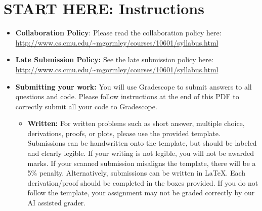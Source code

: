 \documentclass[11pt,addpoints,answers]{exam}
\begin{document}
\section*{START HERE: Instructions}
\begin{itemize}

\item \textbf{Collaboration Policy}: Please read the collaboration policy here: \url{http://www.cs.cmu.edu/~mgormley/courses/10601/syllabus.html}

\item\textbf{Late Submission Policy:} See the late submission policy here: \url{http://www.cs.cmu.edu/~mgormley/courses/10601/syllabus.html}

\item\textbf{Submitting your work:} You will use Gradescope to submit
  answers to all questions and code. Please
  follow instructions at the end of this PDF to correctly submit all your code to Gradescope.

  \begin{itemize}
    

    
   \item \textbf{Written:} For written problems such as short answer, multiple choice, derivations, proofs, or plots, please use the provided template. Submissions can be handwritten onto the template, but should be labeled and clearly legible. If your writing is not legible, you will not be awarded marks. If your scanned submission misaligns the template, there will be a 5\% penalty. Alternatively, submissions can be written in LaTeX. 
   Each derivation/proof should be completed in the boxes provided. If you do not follow the template, your assignment may not be graded correctly by our AI assisted grader.


\end{itemize}
\end{itemize}
\end{document}
